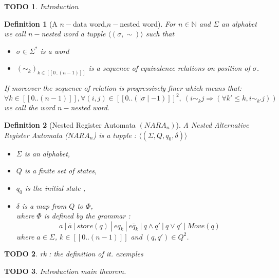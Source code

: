 \documentclass[a4paper,10pt]{report}
\title{}
\author{}
\newtheorem{df}{Definition}
\newtheorem{td}{TODO}
\newcommand{\seg}[1]{[\![#1]\!]}
\newcommand{\segw}[1]{\seg{0..(\mid #1\mid -1)}}
\newcommand{\ts}{\seg{0 .. (n-1)}}
\begin{document}
\maketitle

\begin{td}
  Introduction
\end{td}

\begin{df}[A $n-$data word,$n-$nested word]
 For $n \in \mathbb{N}$ and $\Sigma$ an alphabet we call $n-$nested word a tupple  
 $\langle (\sigma , \sim )  \rangle$
 such that 
  \begin{itemize}
   \item $\sigma \in \Sigma^* $ is a word
   \item $(\sim_k)_{k \in \ts }$ is a sequence of equivalence relations on position of $\sigma$. 
  \end{itemize}
  If moreover the sequence of relation is progressively finer which means that:  
  $$\forall k \in \ts, \forall (i,j) \in \segw{\sigma}^2, \ (i \sim_k j \Rightarrow \left ( \forall k' \leq k, i \sim_{k'} j \right )) $$ 
   we call the word $n-$nested word.
\end{df}



\begin{df}[Nested Register Automata $(NARA_n)$]
  A Nested Alternative Register Automata ($NARA_n$) is a tupple : 
  $\langle (\Sigma ,Q ,q_0, \delta )  \rangle$
  \begin{itemize}
   \item $\Sigma$ is an alphabet,
   \item $Q$ is a finite set of states,
   \item $q_0$ is the initial state ,
   \item $ \delta $ is a map from $Q $ to $\Phi $, \\ 
   where $\Phi$ is defined by the grammar : 
   $$ a \ | \  \overline{a} \ | \ store(q) \ | \ eq_k \ | \  \overline{eq_k} \ | \  q \wedge q' \ | \ q \vee q' \ | \ Move(q)  $$
  where $a \in \Sigma$, $k \in  \ts$ and $(q,q') \in Q^2$.
  \end{itemize}

\end{df}
\begin{td}
  rk : the definition of it.
  exemples
\end{td}

\begin{td}
  Introduction main theorem.
\end{td}
\end{document}
